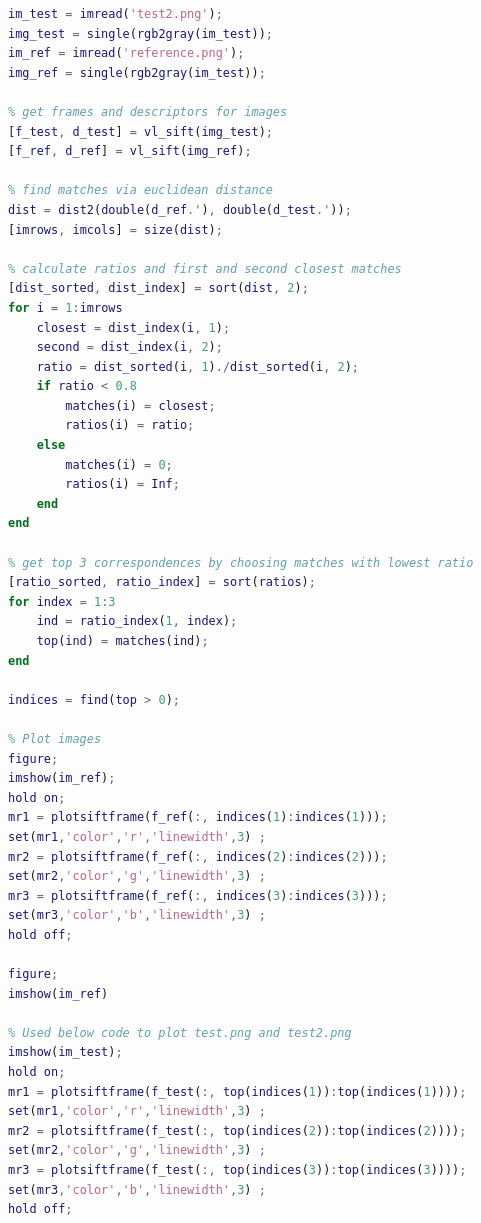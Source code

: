 \documentclass{csc_assignment4}
\begin{document}
\begin{description}
\begin{enumerate}[label=(\alph*)]
\begin{lstlisting}[language=MATLAB]
% read images and grayscale
im_test = imread('test2.png');
img_test = single(rgb2gray(im_test));
im_ref = imread('reference.png');
img_ref = single(rgb2gray(im_test));

% get frames and descriptors for images
[f_test, d_test] = vl_sift(img_test);
[f_ref, d_ref] = vl_sift(img_ref);

% find matches via euclidean distance
dist = dist2(double(d_ref.'), double(d_test.'));
[imrows, imcols] = size(dist);

% calculate ratios and first and second closest matches
[dist_sorted, dist_index] = sort(dist, 2);
for i = 1:imrows
    closest = dist_index(i, 1);
    second = dist_index(i, 2);
    ratio = dist_sorted(i, 1)./dist_sorted(i, 2);
    if ratio < 0.8
        matches(i) = closest;
        ratios(i) = ratio;
    else
        matches(i) = 0;
        ratios(i) = Inf;
    end
end

% get top 3 correspondences by choosing matches with lowest ratio
[ratio_sorted, ratio_index] = sort(ratios);
for index = 1:3
    ind = ratio_index(1, index);
    top(ind) = matches(ind);
end

indices = find(top > 0);

% Plot images
figure;
imshow(im_ref);
hold on;
mr1 = plotsiftframe(f_ref(:, indices(1):indices(1))); 
set(mr1,'color','r','linewidth',3) ;
mr2 = plotsiftframe(f_ref(:, indices(2):indices(2))); 
set(mr2,'color','g','linewidth',3) ;
mr3 = plotsiftframe(f_ref(:, indices(3):indices(3))); 
set(mr3,'color','b','linewidth',3) ;
hold off;  

figure;
imshow(im_ref)

% Used below code to plot test.png and test2.png
imshow(im_test);
hold on;
mr1 = plotsiftframe(f_test(:, top(indices(1)):top(indices(1))));
set(mr1,'color','r','linewidth',3) ;
mr2 = plotsiftframe(f_test(:, top(indices(2)):top(indices(2)))); 
set(mr2,'color','g','linewidth',3) ;
mr3 = plotsiftframe(f_test(:, top(indices(3)):top(indices(3)))); 
set(mr3,'color','b','linewidth',3) ;
hold off;



\end{lstlisting}
\end{enumerate}
\end{description}
\end{document}
